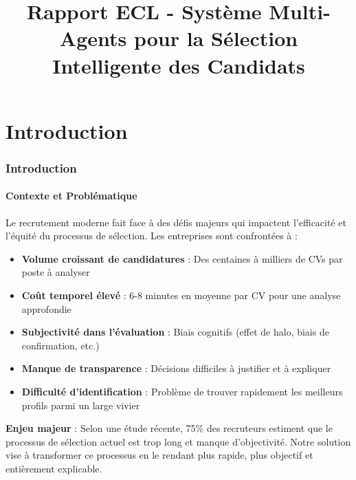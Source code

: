 \documentclass{rapportECL}
\title{Rapport ECL - Système Multi-Agents pour la Sélection Intelligente des Candidats}
\begin{document}

\fairemarges
\fairepagedegarde
\tabledematieres

\onehalfspacing


\part{Introduction}

\section{Introduction}

\subsection{Contexte et Problématique}

Le recrutement moderne fait face à des défis majeurs qui impactent l'efficacité et l'équité du processus de sélection. Les entreprises sont confrontées à :

\begin{itemize}[leftmargin=*]
    \item \textbf{Volume croissant de candidatures} : Des centaines à milliers de CVs par poste à analyser
    \item \textbf{Coût temporel élevé} : 6-8 minutes en moyenne par CV pour une analyse approfondie
    \item \textbf{Subjectivité dans l'évaluation} : Biais cognitifs (effet de halo, biais de confirmation, etc.)
    \item \textbf{Manque de transparence} : Décisions difficiles à justifier et à expliquer
    \item \textbf{Difficulté d'identification} : Problème de trouver rapidement les meilleurs profils parmi un large vivier
\end{itemize}

\begin{importantbox}
\textbf{Enjeu majeur} : Selon une étude récente, 75\% des recruteurs estiment que le processus de sélection actuel est trop long et manque d'objectivité. Notre solution vise à transformer ce processus en le rendant plus rapide, plus objectif et entièrement explicable.
\end{importantbox}
\end{document}
